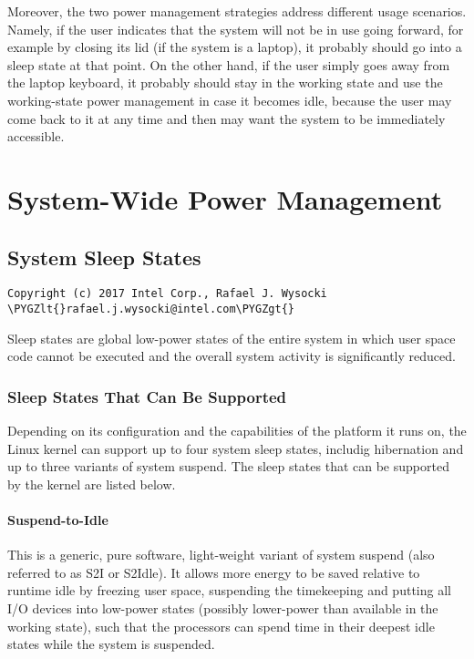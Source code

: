 \documentclass[a4paper,8pt,english]{sphinxmanual}
\def\PYGZlt{\char`\<}
\def\PYGZgt{\char`\>}
\begin{document}
Moreover, the two power management strategies address different usage scenarios.
Namely, if the user indicates that the system will not be in use going forward,
for example by closing its lid (if the system is a laptop), it probably should
go into a sleep state at that point.  On the other hand, if the user simply goes
away from the laptop keyboard, it probably should stay in the working state and
use the working-state power management in case it becomes idle, because the user
may come back to it at any time and then may want the system to be immediately
accessible.


\section{System-Wide Power Management}
\label{admin-guide/pm/system-wide::doc}\label{admin-guide/pm/system-wide:system-wide-power-management}

\subsection{System Sleep States}
\label{admin-guide/pm/sleep-states:system-sleep-states}\label{admin-guide/pm/sleep-states::doc}
\begin{Verbatim}[commandchars=\\\{\}]
Copyright (c) 2017 Intel Corp., Rafael J. Wysocki \PYGZlt{}rafael.j.wysocki@intel.com\PYGZgt{}
\end{Verbatim}

Sleep states are global low-power states of the entire system in which user
space code cannot be executed and the overall system activity is significantly
reduced.


\subsubsection{Sleep States That Can Be Supported}
\label{admin-guide/pm/sleep-states:sleep-states-that-can-be-supported}
Depending on its configuration and the capabilities of the platform it runs on,
the Linux kernel can support up to four system sleep states, includig
hibernation and up to three variants of system suspend.  The sleep states that
can be supported by the kernel are listed below.


\paragraph{Suspend-to-Idle}
\label{admin-guide/pm/sleep-states:suspend-to-idle}\label{admin-guide/pm/sleep-states:s2idle}
This is a generic, pure software, light-weight variant of system suspend (also
referred to as S2I or S2Idle).  It allows more energy to be saved relative to
runtime idle by freezing user space, suspending the timekeeping and putting all
I/O devices into low-power states (possibly lower-power than available in the
working state), such that the processors can spend time in their deepest idle
states while the system is suspended.
\end{document}
